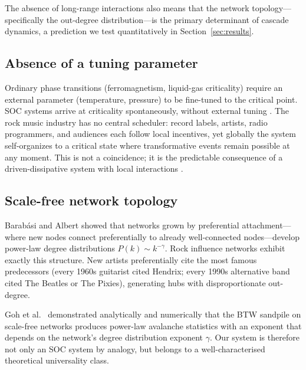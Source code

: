 \documentclass[12pt, a4paper]{article}
\begin{document}
The absence of long-range interactions also means that the
network topology---specifically the out-degree distribution---is
the primary determinant of cascade dynamics, a prediction we
test quantitatively in Section~\ref{sec:results}.

\subsection{Absence of a tuning parameter}

Ordinary phase transitions (ferromagnetism, liquid-gas
criticality) require an external parameter (temperature, pressure)
to be fine-tuned to the critical point.
SOC systems arrive at criticality spontaneously, without external
tuning \citep{bak1996}.
The rock music industry has no central scheduler: record labels,
artists, radio programmers, and audiences each follow local
incentives, yet globally the system self-organizes to a
critical state where transformative events remain possible
at any moment.
This is not a coincidence; it is the predictable consequence
of a driven-dissipative system with local interactions
\citep{jensen1998}.

\subsection{Scale-free network topology}

Barab\'{a}si and Albert \citeyearpar{barabasi1999} showed that
networks grown by preferential attachment---where new nodes connect
preferentially to already well-connected nodes---develop
power-law degree distributions $P(k)\sim k^{-\gamma}$.
Rock influence networks exhibit exactly this structure.
New artists preferentially cite the most famous predecessors
(every 1960s guitarist cited Hendrix; every 1990s alternative
band cited The Beatles or The Pixies), generating hubs
with disproportionate out-degree.

Goh et al.\ \citeyearpar{goh2003} demonstrated analytically and
numerically that the BTW sandpile on scale-free networks produces
power-law avalanche statistics with an exponent that depends on
the network's degree distribution exponent $\gamma$.
Our system is therefore not only an SOC system by analogy, but
belongs to a well-characterised theoretical universality class.
\end{document}
